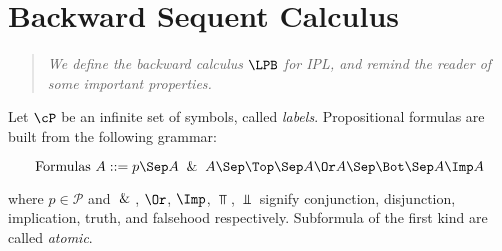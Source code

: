 

\section{Backward Sequent Calculus}
\label{prop.sec.def}

\begin{quote}
  \textit{We define the backward calculus $\LPB$ for
    IPL, and remind the reader of some important properties.}
\end{quote}

\noindent
Let $\cP$ be an infinite set of symbols, called \emph{labels}.
Propositional formulas are built from the following grammar:
\index{$\cP$}

\[
\mbox{Formulas } A ::= p \Sep A \And A \Sep \Top \Sep A \Or A
  \Sep \Bot \Sep A \Imp A
\]

\noindent where $p\in\mathcal{P}$ and $\And$, $\Or$, $\Imp$, $\Top$, $\Bot$
signify conjunction, disjunction, implication, truth, and falsehood
respectively.  Subformula of the first kind are called \emph{atomic}.

